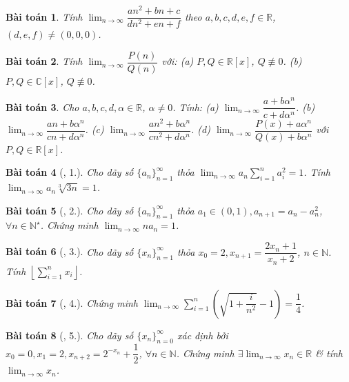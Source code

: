 \documentclass[oneside]{book}
\newtheorem{baitoan}{Bài toán}
\begin{document}
\begin{baitoan}
	Tính $\lim_{n\to\infty} \dfrac{an^2 + bn + c}{dn^2 + en + f}$ theo $a,b,c,d,e,f\in\mathbb{R}$, $(d,e,f)\ne(0,0,0)$.
\end{baitoan}

\begin{baitoan}
	Tính $\lim_{n\to\infty} \dfrac{P(n)}{Q(n)}$ với: (a) $P,Q\in\mathbb{R}[x]$, $Q\not\equiv0$. (b) $P,Q\in\mathbb{C}[x]$, $Q\not\equiv0$.
\end{baitoan}

\begin{baitoan}
	Cho $a,b,c,d,\alpha\in\mathbb{R}$, $\alpha\ne0$. Tính: (a) $\lim_{n\to\infty} \dfrac{a + b\alpha^n}{c + d\alpha^n}$. (b) $\lim_{n\to\infty} \dfrac{an + b\alpha^n}{cn + d\alpha^n}$. (c) $\lim_{n\to\infty} \dfrac{an^2 + b\alpha^n}{cn^2 + d\alpha^n}$. (d) $\lim_{n\to\infty} \dfrac{P(x) + a\alpha^n}{Q(x) + b\alpha^n}$ với $P,Q\in\mathbb{R}[x]$.
\end{baitoan}

\begin{baitoan}[\cite{TLCT_dai_so_giai_tich_11}, 1.]
	Cho dãy số $\{a_n\}_{n=1}^\infty$ thỏa $\lim_{n\to\infty} a_n\sum_{i=1}^n a_i^2 = 1$. Tính $\lim_{n\to\infty} a_n\sqrt[3]{3n} = 1$.
\end{baitoan}

\begin{baitoan}[\cite{TLCT_dai_so_giai_tich_11}, 2.]
	Cho dãy số $\{a_n\}_{n=1}^\infty$ thỏa $a_1\in(0,1),a_{n+1} = a_n - a_n^2$, $\forall n\in\mathbb{N}^\star$. Chứng minh $\lim_{n\to\infty} na_n = 1$.
\end{baitoan}

\begin{baitoan}[\cite{TLCT_dai_so_giai_tich_11}, 3.]
	Cho dãy số $\{x_n\}_{n=1}^\infty$ thỏa $x_0 = 2,x_{n+1} = \dfrac{2x_n + 1}{x_n + 2}$, $n\in\mathbb{N}$. Tính $\left\lfloor\sum_{i=1}^n x_i\right\rfloor$.
\end{baitoan}

\begin{baitoan}[\cite{TLCT_dai_so_giai_tich_11}, 4.]
	Chứng minh $\lim_{n\to\infty} \sum_{i=1}^n \left(\sqrt{1 + \dfrac{i}{n^2}} - 1\right) = \dfrac{1}{4}$.
\end{baitoan}

\begin{baitoan}[\cite{TLCT_dai_so_giai_tich_11}, 5.]
	Cho dãy số $\{x_n\}_{n=0}^\infty$ xác định bởi $x_0 = 0,x_1 = 2,x_{n+2} = 2^{-x_n} + \dfrac{1}{2}$, $\forall n\in\mathbb{N}$. Chứng minh $\exists\lim_{n\to\infty} x_n\in\mathbb{R}$ \& tính $\lim_{n\to\infty} x_n$.
\end{baitoan}
\end{document}
